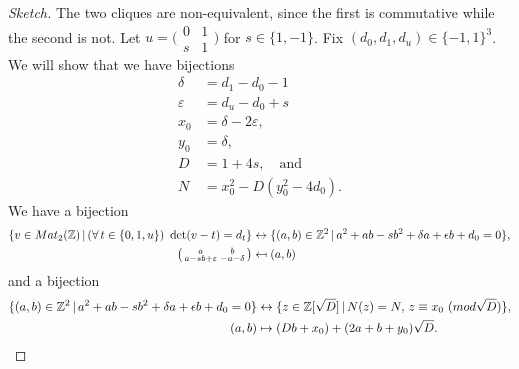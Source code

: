 \documentclass[10pt,a4paper]{amsart}
\newcommand{\Z}{\ensuremath{\mathbb{Z}}}
\newcommand{\clq}{C}
\newcommand{\mapsfrom}{\mathrel{\reflectbox{\ensuremath{\mapsto}}}}
\begin{document}
	\begin{proof}[Sketch]
		The two cliques are non-equivalent, since the first is commutative while the second is not. 
		Let \(u=\big(\begin{smallmatrix}0&1\\s&1\end{smallmatrix}\big)\) for \(s\in\{1,-1\}\).
		Fix \((d_0,d_1,d_u)\in\{-1,1\}^3\).
		We will show that we have bijections 
		\begin{align*} 
			\delta&=d_1-d_0-1 \\
			\varepsilon &= d_u-d_0+s \\
			x_0&=\delta-2\varepsilon, \\
			y_0&=\delta, \\
			D&=1+4s, \quad\text{and}\\
			N&=x_0^2-D(y_0^2-4d_0).
		\end{align*}
		We have a bijection
		\begin{align*}
			\{v\in\textup{Mat}_2(\Z) \,|\, (\forall\, t\in\{0,1,u\})\ \det(v-t)=d_t \} &\leftrightarrow \{(a,b)\in\Z^2 \,|\, a^2+ab-sb^2+\delta a+\epsilon b+d_0=0 \}, \\
			\big(\begin{smallmatrix}a&b\\a-sb+\varepsilon&-a-\delta\end{smallmatrix}\big) &\mapsfrom (a,b)
		\end{align*}
		and a bijection
		\begin{align*}
			\{(a,b)\in\Z^2 \,|\, a^2+ab-sb^2+\delta a+\epsilon b+d_0=0 \} &\leftrightarrow \{  z \in \Z[\sqrt{D}] \,|\, N(z)=N,\, z \equiv x_0\ (\textup{mod }\sqrt{D}) \}, \\
			(a,b) &\mapsto (Db+x_0) + (2a+b+y_0)\sqrt{D}.
		\end{align*}
		

\end{proof}
\end{document}
